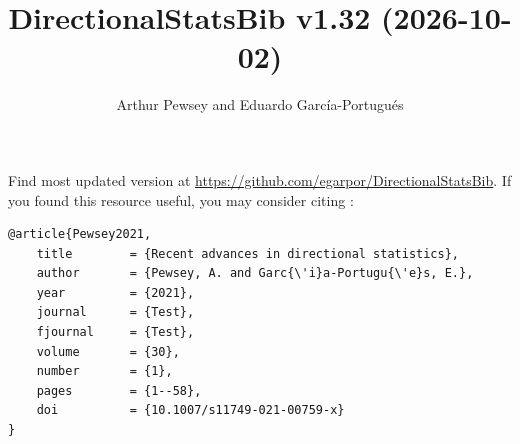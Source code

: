 \documentclass[10pt]{article}
\title{DirectionalStatsBib v1.32 (2026-10-02)}
\author{Arthur Pewsey and Eduardo García-Portugués}
\date{}
\begin{document}
\maketitle

Find most updated version at \url{https://github.com/egarpor/DirectionalStatsBib}. If you found this resource useful, you may consider citing \cite{Pewsey2021}:
\begin{verbatim}
@article{Pewsey2021,
    title        = {Recent advances in directional statistics},
    author       = {Pewsey, A. and Garc{\'i}a-Portugu{\'e}s, E.},
    year         = {2021},
    journal      = {Test},
    fjournal     = {Test},
    volume       = {30},
    number       = {1},
    pages        = {1--58},
    doi          = {10.1007/s11749-021-00759-x}
}
\end{verbatim}

\nocite{*}

\setlength\bibsep{0cm}
\setlength\bibhang{0.25cm}



\end{document}
